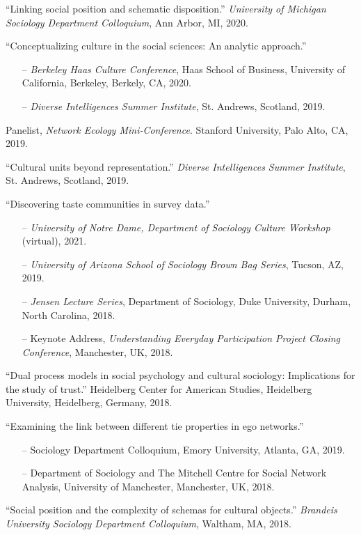 \ind ``Linking social position and schematic disposition.'' {\em University of Michigan Sociology Department Colloquium}, Ann Arbor, MI, 2020.

\ind ``Conceptualizing culture in the social sciences: An analytic approach.''
\begin{itemize}[leftmargin=0.8in, topsep = 0pt]
	\setlength\itemsep{-0.55em}
	\item[--] {\em Berkeley Haas Culture Conference}, Haas School of Business, University of California, Berkeley, Berkely, CA, 2020.
	\item[--] {\em Diverse Intelligences Summer Institute}, St. Andrews, Scotland, 2019.
\end{itemize}

\ind Panelist, \emph{Network Ecology Mini-Conference}. Stanford University, Palo Alto, CA, 2019.

\ind ``Cultural units beyond representation.'' {\em Diverse Intelligences Summer Institute}, St. Andrews, Scotland, 2019.

\ind ``Discovering taste communities in survey data.''

\begin{itemize}[leftmargin=0.8in, topsep = 0pt]
	\setlength\itemsep{-0.55em}
	\item[--] {\em University of Notre Dame, Department of Sociology Culture Workshop} (virtual), 2021.
	\item[--] {\em University of Arizona School of Sociology Brown Bag Series},  Tucson, AZ, 2019. 
    \item[--]{\em Jensen Lecture Series}, Department of Sociology, Duke University, Durham, North Carolina, 2018.
    \item[--]Keynote Address, {\em Understanding Everyday Participation Project Closing Conference}, Manchester, UK, 2018.
\end{itemize}

\ind ``Dual process models in social psychology and cultural sociology: Implications for the study of trust.'' Heidelberg Center for American Studies, Heidelberg University, Heidelberg, Germany, 2018. 

\ind ``Examining the link between different tie properties in ego networks.'' 
    \begin{itemize}[leftmargin=0.8in, topsep = 0pt]
    \setlength\itemsep{-0.55em}
    \item[--] Sociology Department Colloquium, Emory University, Atlanta, GA, 2019.
	\item[--] Department of Sociology and The Mitchell Centre for Social Network Analysis, University of Manchester, Manchester, UK, 2018.
\end{itemize}

\ind ``Social position and the complexity of schemas for cultural objects.'' {\em Brandeis University Sociology Department Colloquium}, Waltham, MA, 2018.



